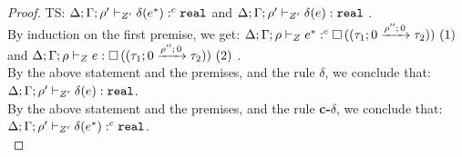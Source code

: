 \begin{proof}
     TS: $  \Delta; \Gamma; \dmap' \ctyping{\nnatA'}{ \eop (\expr^*) }{ \treal } $ and $   \Delta; \Gamma; \dmap' \tvdash{\nnatA'} \eop(\expr):  \treal $ .\\
    By induction on the first premise, we get:
     $  \Delta; \Gamma; \dmap \ctyping{\nnatA}{ \expr^*  }{ \tbox{  (\tarr{ \type_1
        }{ \type_2 }{0}{\dmap''}{0})     }}~(1) $ and $   \Delta; \Gamma; \dmap \tvdash{\nnatA} \expr :  \tbox{  (\tarr{ \type_1
        }{ \type_2 }{0}{\dmap''}{0})     } ~(2)$ .\\
        By the above statement and the premises, and the rule \textbf{$\delta$}, we conclude that: 
     $   \Delta; \Gamma; \dmap' \tvdash{\nnatA'} \eop(\expr):  \treal $.\\
     By the above statement and the premises, and the rule \textbf{c-$\delta$}, we conclude that: 
     $    \Delta; \Gamma; \dmap' \ctyping{\nnatA'}{ \eop (\expr^*) }{ \treal } $.\\
     

\end{proof}

